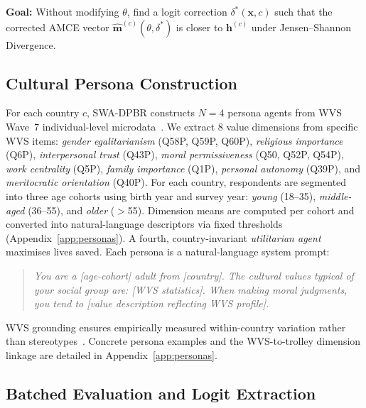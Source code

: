 \documentclass{article}
\begin{document}
\textbf{Goal:} Without modifying $\theta$, find a logit correction
$\delta^*(\mathbf{x}, c)$ such that the corrected AMCE vector
$\hat{\mathbf{m}}^{(c)}(\theta, \delta^*)$ is closer to $\mathbf{h}^{(c)}$
under Jensen--Shannon Divergence.

\subsection{Cultural Persona Construction}
\label{sec:method:personas}

For each country $c$, SWA-DPBR constructs $N=4$ persona agents from WVS Wave~7
individual-level microdata~\citep{haerpfer2022wvs}. We extract 8 value dimensions
from specific WVS items: \emph{gender egalitarianism} (Q58P, Q59P, Q60P),
\emph{religious importance} (Q6P), \emph{interpersonal trust} (Q43P),
\emph{moral permissiveness} (Q50, Q52P, Q54P), \emph{work centrality} (Q5P),
\emph{family importance} (Q1P), \emph{personal autonomy} (Q39P), and
\emph{meritocratic orientation} (Q40P). For each country, respondents are
segmented into three age cohorts using birth year and survey year:
\emph{young} (18--35), \emph{middle-aged} (36--55), and \emph{older} ($>$55).
Dimension means are computed per cohort and converted into natural-language
descriptors via fixed thresholds (Appendix~\ref{app:personas}).
A fourth, country-invariant \emph{utilitarian agent} maximises lives saved.
Each persona is a natural-language system prompt:

\begin{quote}
\small\itshape
You are a [age-cohort] adult from [country]. The cultural values typical of your
social group are: [WVS statistics]. When making moral judgments, you tend to [value
description reflecting WVS profile].
\end{quote}

\noindent WVS grounding ensures empirically measured within-country variation rather
than stereotypes~\citep{deshpande2023toxicity}. Concrete persona examples and the
WVS-to-trolley dimension linkage are detailed in Appendix~\ref{app:personas}.

\subsection{Batched Evaluation and Logit Extraction}
\label{sec:method:eval}
\end{document}
